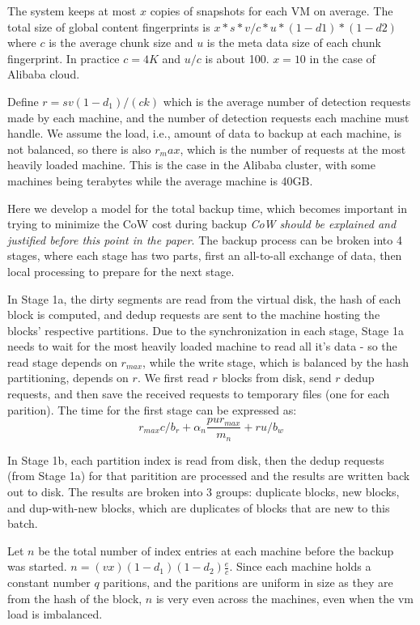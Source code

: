 The system keeps at most  $ x$ copies of snapshots for each VM on average.  The
total size of  global content fingerprints is $x*s*v/c*u *(1-d1)*(1-d2)$ where
$c$ is the average chunk size and $u$ is the meta data size of each chunk
fingerprint. In practice $c=4K$ and $u/c$  is about 100.  $x=10$ in the case of
Alibaba cloud.

Define $r = s v (1-d_1)/(ck)$  which is the average number of detection
requests made by each machine, and the number of detection requests each
machine must handle.  We assume the load, i.e., amount of data to backup at
each machine, is not balanced, so there is also $r_max$, which is the number of
requests at the most heavily loaded machine. This is the case in the Alibaba
cluster, with some machines being terabytes while the average machine is 40GB.

Here we develop a model for the total backup time, which becomes important in
trying to minimize the CoW cost during backup \emph{CoW should be explained and
justified before this point in the paper}.  The backup process can be broken
into 4 stages, where each stage has two parts, first an all-to-all exchange of
data, then local processing to prepare for the next stage.

In Stage 1a, the dirty segments are read from the virtual disk, the hash of
each block is computed, and dedup requests are sent to the machine hosting the
blocks' respective partitions. Due to the synchronization in each stage, Stage
1a needs to wait for the most heavily loaded machine to read all it's data - so
the read stage depends on $r_{max}$, while the write stage, which is balanced
by the hash partitioning, depends on $r$. We first read $r$ blocks from disk,
send $r$ dedup requests, and then save the received requests to temporary files
(one for each parition). The time for the first stage can be expressed as:
\[
    r_{max} c / b_r + \alpha_n\frac{p u r_{max}}{m_n} + r u / b_w
\]

In Stage 1b, each partition index is read from disk, then the dedup requests
(from Stage 1a) for that paritition are processed and the results are written
back out to disk. The results are broken into 3 groups: duplicate blocks, new
blocks, and dup-with-new blocks, which are duplicates of blocks that are new to
this batch.

Let $n$ be the total number of index entries at each machine before the backup
was started.  $n=(v x)(1-d_1)(1-d_2)\frac{e}{c}$. Since each machine holds a
constant number $q$ paritions, and the paritions are uniform in size as they
are from the hash of the block, $n$ is very even across the machines, even when
the vm load is imbalanced.

